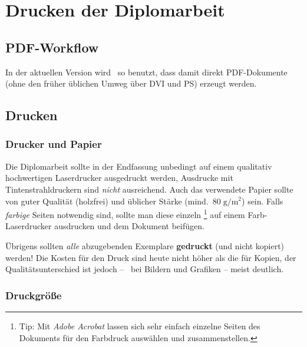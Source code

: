 \chapter{Drucken der Diplomarbeit}
\label{chap:Drucken}




\section{PDF-Workflow}
\label{sec:pdf}

In der aktuellen Version wird \latex\ so benutzt, dass damit direkt PDF-Dokumente (ohne den früher üblichen Umweg über DVI und PS) erzeugt werden.


\section{Drucken}

\subsection{Drucker und Papier}

Die Diplomarbeit sollte in der Endfassung unbedingt auf einem
qualitativ hochwertigen Laserdrucker ausgedruckt werden, Ausdrucke
mit Tintenstrahldruckern sind \emph{nicht} ausreichend. Auch das
verwendete Papier sollte von guter Qualität (holzfrei) und
üblicher Stärke (mind.\ $80\; {\mathrm g} / {\mathrm m}^2$) sein.
Falls \emph{farbige} Seiten notwendig sind, sollte man diese einzeln%
\footnote{Tip: Mit \emph{Adobe Acrobat} lassen sich sehr einfach einzelne Seiten
des Dokuments für den Farbdruck auswählen und zusammenstellen.}
auf einem Farb-Laserdrucker ausdrucken und dem Dokument beifügen.

Übrigens sollten \emph{alle} abzugebenden Exemplare {\bf
gedruckt} (und nicht kopiert) werden! Die Kosten für den Druck
sind heute nicht höher als die für Kopien, der
Qualitätsunterschied ist jedoch -- \va\ bei Bildern und Grafiken
-- meist deutlich.


\subsection{Druckgröße}

